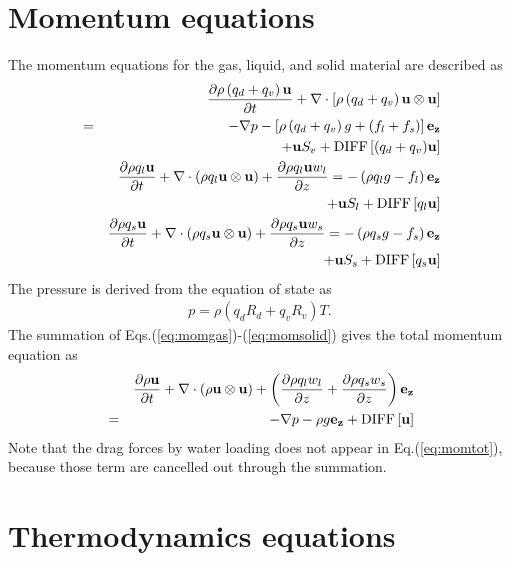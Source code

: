\section{Momentum equations}

The momentum equations for the gas, liquid, and solid material
are described as
\begin{eqnarray}
&&  \frac{\partial \rho \left(q_d+q_v\right) {\bf u}}{\partial t}
+ \nabla \cdot \left[\rho \left(q_d+q_v\right){\bf u} \otimes {\bf u}\right]\\
&=&
-\nabla p - \left[\rho \left(q_d+q_v\right)g + (f_l+f_s)\right] {\bf e_z}\nonumber\\
&&+{\bf u} S_v +{\rm DIFF}\left[(q_d+q_v){\bf u}\right]
\label{eq:momgas}\\
&&  \frac{\partial \rho q_l {\bf u}}{\partial t}
+ \nabla \cdot \left(\rho q_l{\bf u} \otimes {\bf u}\right)
+ \frac{\partial \rho q_l {\bf u} w_l}{\partial z}
=
 - \left(\rho q_l g - f_l\right) {\bf e_z}\nonumber\\
&&+{\bf u} S_l+{\rm DIFF}\left[q_l{\bf u}\right]
\label{eq:momliquid}\\
&&  \frac{\partial \rho q_s {\bf u}}{\partial t}
+ \nabla \cdot \left(\rho q_s{\bf u} \otimes {\bf u}\right)
+ \frac{\partial \rho q_s {\bf u }w_s}{\partial z}
=
 - \left(\rho q_s g - f_s\right) {\bf e_z}\nonumber\\
&&+{\bf u} S_s+{\rm DIFF}\left[q_s{\bf u}\right]
\label{eq:momsolid}
\end{eqnarray}
The pressure is derived from the equation of state as
\begin{eqnarray}
p=\rho \left(q_d R_d + q_v R_v\right) T.\label{eq:state}
\end{eqnarray}
The summation of Eqs.(\ref{eq:momgas})-(\ref{eq:momsolid})
gives the total momentum equation as
\begin{eqnarray}
&&  \frac{\partial \rho {\bf u}}{\partial t}
+ \nabla \cdot \left(\rho{\bf u} \otimes {\bf u}\right)
+ \left(\frac{\partial \rho q_l w_l}{\partial z}
+ \frac{\partial \rho q_s w_s}{\partial z}\right) {\bf e_z}\nonumber\\
&=&
-\nabla p - \rho g {\bf e_z}
+{\rm DIFF}\left[{\bf u}\right]
\label{eq:momtot}
\end{eqnarray}
Note that the drag forces by water loading does not appear
in Eq.(\ref{eq:momtot}),
because those term are cancelled out through the summation.

\section{Thermodynamics equations}


